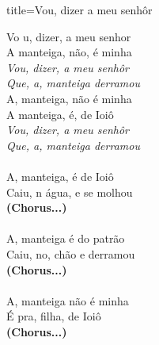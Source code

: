 \documentclass[fontsize=14pt, paper=a4, twoside, DIV=20]{scrreprt} %
\begin{document}
\begin{multicols*}{2}
\begin{song}{title={Vou, dizer a meu senhôr}}
        \begin{verse*}
            Vo u, dizer, a meu senhor\\
            A manteiga, não, é minha\\
            \textit{Vou, dizer, a meu senhôr}\\
            \textit{Que, a, manteiga derramou}\\
            A, manteiga, não é minha\\
            A manteiga, é, de Ioiô\\
            \textit{Vou, dizer, a meu senhôr}\\
            \textit{Que, a, manteiga derramou}\\
\\
            A, manteiga, é de Ioiô\\
            Caiu, n água, e se molhou\\
            \textbf{(Chorus...)}\\
\\
            A, manteiga é do patrão\\
            Caiu, no, chão e derramou\\
            \textbf{(Chorus...)}\\
\\
            A, manteiga não é minha\\
            É pra, filha, de Ioiô\\
            \textbf{(Chorus...)}\\
        \end{verse*}
\end{song}


\end{multicols*}
\end{document}

